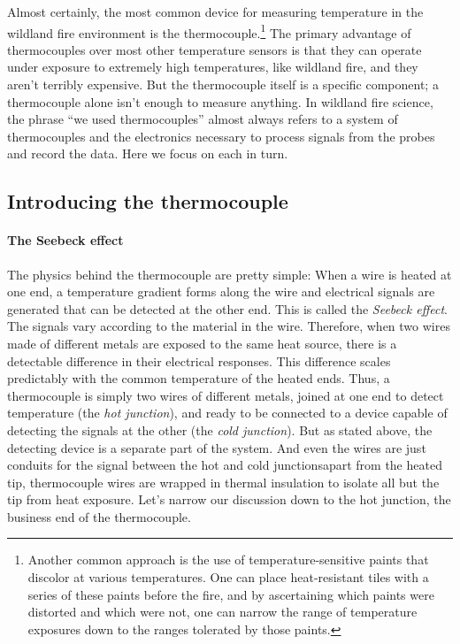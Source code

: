 Almost certainly, the most common device for measuring temperature in the wildland fire environment is the thermocouple.\footnote{
	Another common approach is the use of temperature-sensitive paints that discolor at various temperatures. 
	One can place heat-resistant tiles with a series of these paints before the fire, and by ascertaining which paints were distorted and which were not, one can narrow the range of temperature exposures down to the ranges tolerated by those paints.} 
The primary advantage of thermocouples over most other temperature sensors is that they can operate under exposure to extremely high temperatures, like wildland fire, and they aren't terribly expensive. 
But the thermocouple itself is a specific component; a thermocouple alone isn't enough to measure anything. 
In wildland fire science, the phrase ``we used thermocouples'' almost always refers to a system of thermocouples and the electronics necessary to process signals from the probes and record the data. 
Here we focus on each in turn. 

\subsection{Introducing the thermocouple}

\paragraph{The Seebeck effect}

The physics behind the thermocouple are pretty simple: When a wire is heated at one end, a temperature gradient forms along the wire and electrical signals are generated that can be detected at the other end. 
This is called the \emph{Seebeck effect}. 
The signals vary according to the material in the wire. 
Therefore, when two wires made of different metals are exposed to the same heat source, there is a detectable difference in their electrical responses. 
This difference scales predictably with the common temperature of the heated ends.
Thus, a thermocouple is simply two wires of different metals, joined at one end to detect temperature (the \emph{hot junction}), and ready to be connected to a device capable of detecting the signals at the other (the \emph{cold junction}). 
But as stated above, the detecting device is a separate part of the system. 
And even the wires are just conduits for the signal between the hot and cold junctions\textemdash apart from the heated tip, thermocouple wires are wrapped in thermal insulation to isolate all but the tip from heat exposure. 
Let's narrow our discussion down to the hot junction, the business end of the thermocouple. 

